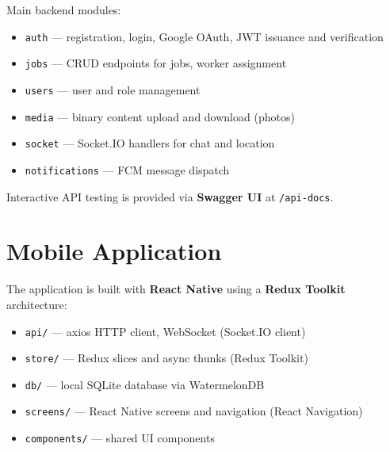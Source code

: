 Main backend modules:
\begin{itemize}
  \item \texttt{auth} --- registration, login, Google OAuth, JWT issuance and verification
  \item \texttt{jobs} --- CRUD endpoints for jobs, worker assignment
  \item \texttt{users} --- user and role management
  \item \texttt{media} --- binary content upload and download (photos)
  \item \texttt{socket} --- Socket.IO handlers for chat and location
  \item \texttt{notifications} --- FCM message dispatch
\end{itemize}

Interactive API testing is provided via \textbf{Swagger UI} at \texttt{/api-docs}.

\section{Mobile Application}

The application is built with \textbf{React Native} using a \textbf{Redux Toolkit} architecture:

\begin{itemize}
  \item \texttt{api/} --- axios HTTP client, WebSocket (Socket.IO client)
  \item \texttt{store/} --- Redux slices and async thunks (Redux Toolkit)
  \item \texttt{db/} --- local SQLite database via WatermelonDB
  \item \texttt{screens/} --- React Native screens and navigation (React Navigation)
  \item \texttt{components/} --- shared UI components
\end{itemize}